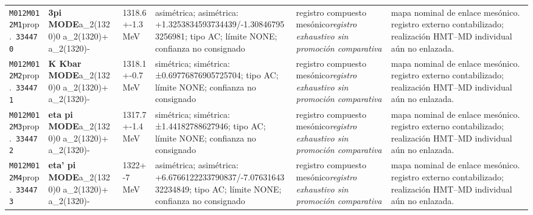 \begin{landscape}
\begin{longtable}{L{1.85cm}L{4.45cm}L{2.35cm}L{4.05cm}L{3.35cm}L{7.15cm}}
\texttt{M012}\newline \texttt{M012M1}\newline prop.\ \texttt{334470} & \textbf{3pi MODE}\newline a\_\allowbreak{}2(1320)0 \textbar{}\allowbreak{} a\_\allowbreak{}2(1320)+ \textbar{}\allowbreak{} a\_\allowbreak{}2(1320)- & 1318.6+-1.3\,MeV & asimétrica; asimétrica: +1.3253834593734439/-1.308467953256981; tipo AC; límite NONE; confianza no consignado & registro compuesto mesónico\newline \emph{registro exhaustivo sin promoción comparativa} & mapa nominal de enlace mesónico. registro externo contabilizado; realización HMT--MD individual aún no enlazada. \\
\texttt{M012}\newline \texttt{M012M2}\newline prop.\ \texttt{334471} & \textbf{K Kbar MODE}\newline a\_\allowbreak{}2(1320)0 \textbar{}\allowbreak{} a\_\allowbreak{}2(1320)+ \textbar{}\allowbreak{} a\_\allowbreak{}2(1320)- & 1318.1+-0.7\,MeV & simétrica; simétrica: ±0.69776876905725704; tipo AC; límite NONE; confianza no consignado & registro compuesto mesónico\newline \emph{registro exhaustivo sin promoción comparativa} & mapa nominal de enlace mesónico. registro externo contabilizado; realización HMT--MD individual aún no enlazada. \\
\texttt{M012}\newline \texttt{M012M3}\newline prop.\ \texttt{334472} & \textbf{eta pi MODE}\newline a\_\allowbreak{}2(1320)0 \textbar{}\allowbreak{} a\_\allowbreak{}2(1320)+ \textbar{}\allowbreak{} a\_\allowbreak{}2(1320)- & 1317.7+-1.4\,MeV & simétrica; simétrica: ±1.44182788627946; tipo AC; límite NONE; confianza no consignado & registro compuesto mesónico\newline \emph{registro exhaustivo sin promoción comparativa} & mapa nominal de enlace mesónico. registro externo contabilizado; realización HMT--MD individual aún no enlazada. \\
\texttt{M012}\newline \texttt{M012M4}\newline prop.\ \texttt{334473} & \textbf{eta' pi MODE}\newline a\_\allowbreak{}2(1320)0 \textbar{}\allowbreak{} a\_\allowbreak{}2(1320)+ \textbar{}\allowbreak{} a\_\allowbreak{}2(1320)- & 1322+-7\,MeV & asimétrica; asimétrica: +6.6766122233790837/-7.0763164332234849; tipo AC; límite NONE; confianza no consignado & registro compuesto mesónico\newline \emph{registro exhaustivo sin promoción comparativa} & mapa nominal de enlace mesónico. registro externo contabilizado; realización HMT--MD individual aún no enlazada. \\

\end{longtable}
\end{landscape}
